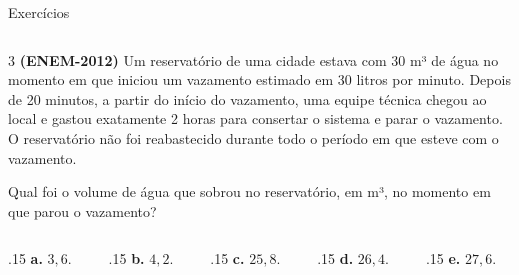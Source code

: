 \documentclass[aspectratio=169, t, 8pt]{beamer}
\begin{document}
    \begin{frame} {Exercícios} %
        \begin{columns}[totalwidth=.9\textwidth]
            \begin{column}{\textwidth}
                3 \textbf{(ENEM-2012) }Um reservatório de uma cidade estava com 30 m³ de água no momento em que iniciou um vazamento estimado em 30 litros por minuto. Depois de 20 minutos, a partir do início do vazamento, uma equipe técnica chegou ao local e gastou exatamente 2 horas para consertar o sistema e parar o vazamento. O reservatório não foi reabastecido durante todo o período em que esteve com o vazamento.

                \vspace{1em}
                
                Qual foi o volume de água que sobrou no reservatório, em m³, no momento em que parou o vazamento?
            \end{column}   
        \end{columns}
            \vspace{1.8em}

        \begin{center}
            \begin{columns}
                \begin{column}{.15\textwidth}
                    \centering
                    \textbf{a. } $3,6.$
                \end{column}
                \begin{column}{.15\textwidth}
                    \centering
                    \textbf{b. } $4,2.$
                \end{column}
                \begin{column}{.15\textwidth}
                    \centering
                    \textbf{c. } $25,8.$
                \end{column}
                \begin{column}{.15\textwidth}
                    \centering
                    \textbf{d. } $26,4.$
                \end{column}
                \begin{column}{.15\textwidth}
                    \centering
                    \textbf{e. } $27,6.$
                \end{column}
            \end{columns}
        \end{center}
    \end{frame}
\end{document}
